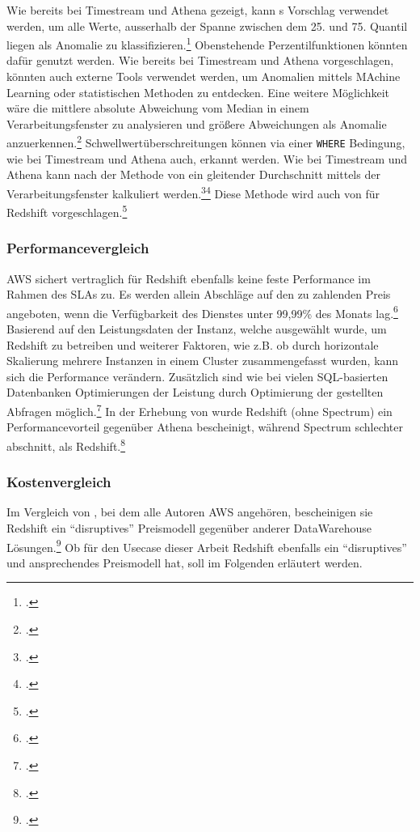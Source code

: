 Wie bereits bei Timestream und Athena gezeigt, kann \citeauthor{Salgado.2019}s Vorschlag verwendet werden, um alle Werte, ausserhalb der Spanne zwischen dem 25. und 75. Quantil liegen als Anomalie zu klassifizieren.\footcite[Vgl.][]{Salgado.2019} Obenstehende Perzentilfunktionen könnten dafür genutzt werden. Wie bereits bei Timestream und Athena vorgeschlagen, könnten auch externe Tools verwendet werden, um Anomalien mittels MAchine Learning oder statistischen Methoden zu entdecken. Eine weitere Möglichkeit wäre die mittlere absolute Abweichung vom Median in einem Verarbeitungsfenster zu analysieren und größere Abweichungen als Anomalie anzuerkennen.\footcite[Vgl.][]{Peak.2017}
Schwellwertüberschreitungen können via einer \texttt{WHERE} Bedingung, wie bei Timestream und Athena auch, erkannt werden.
Wie bei Timestream und Athena kann nach der Methode von \citeauthor{Ross.2020} ein gleitender Durchschnitt mittels der Verarbeitungsfenster kalkuliert werden.\footcite[Vgl.][]{Ross.2020}\nzitat\footcite[Vgl.][]{Ubiq.o.J.} Diese Methode wird auch von \citeauthor{Ubiq.o.J.} für Redshift vorgeschlagen.\footcite[Vgl.][]{Ubiq.o.J.}

\subsubsection{Performancevergleich}
\ac{AWS} sichert vertraglich für Redshift ebenfalls keine feste Performance im Rahmen des \acp{SLA} zu. Es werden allein Abschläge auf den zu zahlenden Preis angeboten, wenn die Verfügbarkeit des Dienstes unter 99,99\% des Monats lag.\footcite[Vgl.][]{AmazonWebServicesInc..2019b} Basierend auf den Leistungsdaten der Instanz, welche ausgewählt wurde, um Redshift zu betreiben und weiterer Faktoren, wie z.B. ob durch horizontale Skalierung mehrere Instanzen in einem Cluster zusammengefasst wurden, kann sich die Performance verändern. Zusätzlich sind wie bei vielen \ac{SQL}-basierten Datenbanken Optimierungen der Leistung durch Optimierung der gestellten Abfragen möglich.\footcite[Vgl.][]{AmazonWebServicesInc..o.J.ab} In der Erhebung von \citeauthor{Tan.2019} wurde Redshift (ohne Spectrum) ein Performancevorteil gegenüber Athena bescheinigt, während Spectrum schlechter abschnitt, als Redshift.\footcite[Vgl.][2176]{Tan.2019}


\subsubsection{Kostenvergleich}
Im Vergleich von \citeauthor{Gupta.2015}, bei dem alle Autoren \ac{AWS} angehören, bescheinigen sie Redshift ein \enquote{disruptives} Preismodell gegenüber anderer DataWarehouse Lösungen.\footcite[Vgl.][]{Gupta.2015} Ob für den Usecase dieser Arbeit Redshift ebenfalls ein \enquote{disruptives} und ansprechendes Preismodell hat, soll im Folgenden erläutert werden.

